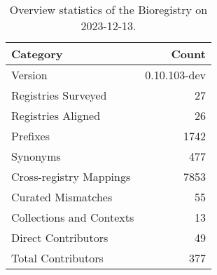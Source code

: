 \begin{table}
\caption{Overview statistics of the Bioregistry on 2023-12-13.}
\label{tab:bioregistry-summary}
\begin{tabular}{lr}
\toprule
Category & Count \\
\midrule
Version & 0.10.103-dev \\
Registries Surveyed & 27 \\
Registries Aligned & 26 \\
Prefixes & 1742 \\
Synonyms & 477 \\
Cross-registry Mappings & 7853 \\
Curated Mismatches & 55 \\
Collections and Contexts & 13 \\
Direct Contributors & 49 \\
Total Contributors & 377 \\
\bottomrule
\end{tabular}
\end{table}
